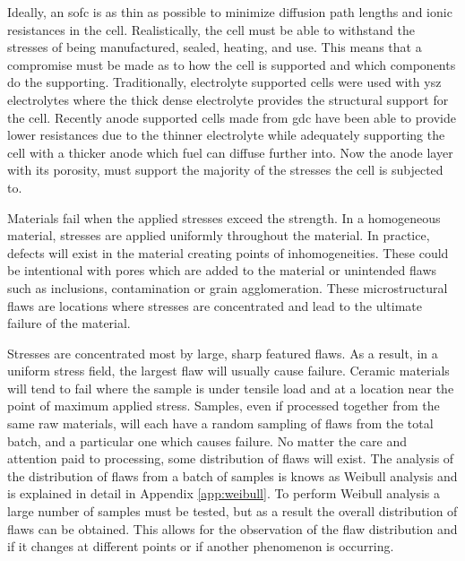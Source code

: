 Ideally, an \gls{sofc} is as thin as possible to minimize diffusion path lengths and ionic resistances in the cell.\cite{Chan2001}
Realistically, the cell must be able to withstand the stresses of being manufactured, sealed, heating, and use.
This means that a compromise must be made as to how the cell is supported and which components do the supporting.
Traditionally, electrolyte supported cells were used with \gls{ysz} electrolytes where the thick dense electrolyte provides the structural support for the cell.
Recently anode supported cells made from \gls{gdc} have been able to provide lower resistances due to the thinner electrolyte while adequately supporting the cell with a thicker anode which fuel can diffuse further into.\cite{Fleischhauer2014a,Laurencin2008}
Now the anode layer with its porosity, must support the majority of the stresses the cell is subjected to.

Materials fail when the applied stresses exceed the strength.
In a homogeneous material, stresses are applied uniformly throughout the material.
In practice, defects will exist in the material creating points of inhomogeneities.
These could be intentional with pores which are added to the material or unintended flaws such as inclusions, contamination or grain agglomeration.
These microstructural flaws are locations where stresses are concentrated and lead to the ultimate failure of the material.

Stresses are concentrated most by large, sharp featured flaws.
As a result, in a uniform stress field, the largest flaw will usually cause failure.
Ceramic materials will tend to fail where the sample is under tensile load and at a location near the point of maximum applied stress.
Samples, even if processed together from the same raw materials, will each have a random sampling of flaws from the total batch, and a particular one which causes failure.
No matter the care and attention paid to processing, some distribution of flaws will exist.
The analysis of the distribution of flaws from a batch of samples is knows as Weibull analysis and is explained in detail in Appendix \ref{app:weibull}.
To perform Weibull analysis a large number of samples must be tested, but as a result the overall distribution of flaws can be obtained.
This allows for the observation of the flaw distribution and if it changes at different points or if another phenomenon is occurring.


